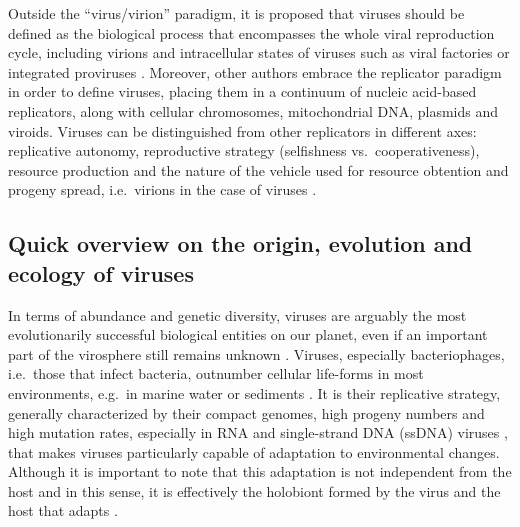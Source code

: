 \documentclass[
  openany]{book}
\begin{document}
Outside the ``virus/virion'' paradigm, it is proposed that viruses should be defined as the biological process that encompasses the whole viral reproduction cycle, including virions and intracellular states of viruses such as viral factories or integrated proviruses \autocite{Forterre2016}. Moreover, other authors embrace the replicator paradigm \autocite{Dawkins1976} in order to define viruses, placing them in a continuum of nucleic acid-based replicators, along with cellular chromosomes, mitochondrial DNA, plasmids and viroids. Viruses can be distinguished from other replicators in different axes: replicative autonomy, reproductive strategy (selfishness vs.~cooperativeness), resource production and the nature of the vehicle used for resource obtention and progeny spread, i.e.~virions in the case of viruses \autocite{Koonin2016}.

\hypertarget{quick-overview-on-the-origin-evolution-and-ecology-of-viruses}{%
\subsection{Quick overview on the origin, evolution and ecology of viruses}\label{quick-overview-on-the-origin-evolution-and-ecology-of-viruses}}

In terms of abundance and genetic diversity, viruses are arguably the most evolutionarily successful biological entities on our planet, even if an important part of the virosphere still remains unknown \autocite{Wasik2013}. Viruses, especially bacteriophages, i.e.~those that infect bacteria, outnumber cellular life-forms in most environments, e.g.~in marine water or sediments \autocite{Edwards2005}. It is their replicative strategy, generally characterized by their compact genomes, high progeny numbers and high mutation rates, especially in RNA and single-strand DNA (ssDNA) viruses \autocite{Belshaw2007,Sanjuan2010}, that makes viruses particularly capable of adaptation to environmental changes. Although it is important to note that this adaptation is not independent from the host and in this sense, it is effectively the holobiont formed by the virus and the host that adapts \autocite{Agudelo-Romero2008}.
\end{document}
